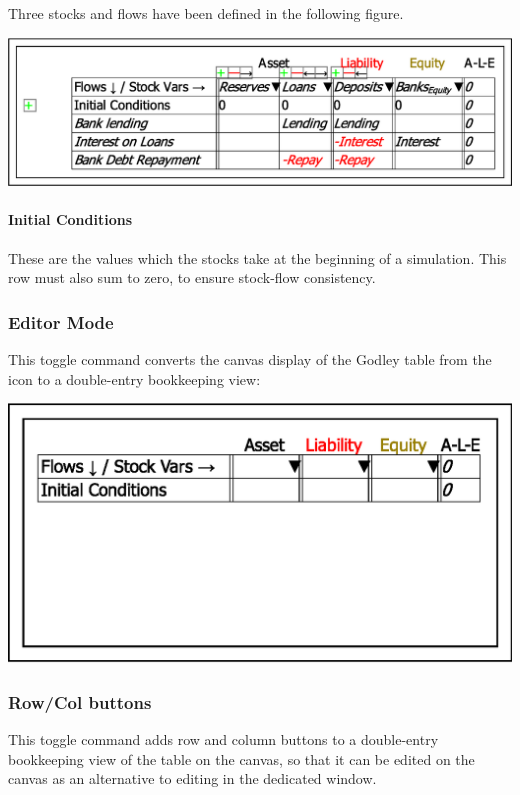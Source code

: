 Three stocks and flows have been defined in the following figure. 

\noindent\includegraphics[width=\textwidth]{images/GodleyTableEditMode3StocksAndFlows}

\paragraph{Initial Conditions}

These are the values which the stocks take at the beginning of a simulation.
This row must also sum to zero, to ensure stock-flow consistency.

\subsubsection{Editor Mode}

This toggle command converts the canvas display of the Godley table
from the icon to a double-entry bookkeeping view:

\noindent\includegraphics[width=\textwidth]{images/GodleyTableEditMode}

\subsubsection{Row/Col buttons}

This toggle command adds row and column buttons to a double-entry
bookkeeping view of the table on the canvas, so that it can be edited
on the canvas as an alternative to editing in the dedicated window.

